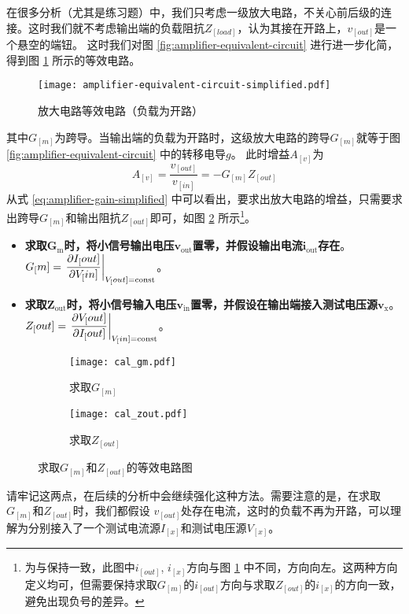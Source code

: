 在很多分析（尤其是练习题）中，我们只考虑一级放大电路，不关心前后级的连接。这时我们就不考虑输出端的负载阻抗$Z_[load]$，认为其接在开路上，$v_[out]$是一个悬空的端钮。
这时我们对图 \ref{fig:amplifier-equivalent-circuit} 进行进一步化简，得到图 \ref{fig:amplifier-equivalent-circuit-simplified} 所示的等效电路。
\begin{figure}[h!tb]
    \centering
    \texttt{[image: amplifier-equivalent-circuit-simplified.pdf]}
    \caption{放大电路等效电路（负载为开路）}
    \label{fig:amplifier-equivalent-circuit-simplified}
\end{figure}
其中$G_[m]$为跨导。当输出端的负载为开路时，这级放大电路的跨导$G_[m]$就等于图 \ref{fig:amplifier-equivalent-circuit} 中的转移电导$g$。
此时增益$A_[v]$为
\begin{equation}
    A_[v] = \frac{v_[out]}{v_[in]} = -G_[m] Z_[out]
    \label{eq:amplifier-gain-simplified}
\end{equation}
从式 \ref{eq:amplifier-gain-simplified} 中可以看出，要求出放大电路的增益，只需要求出跨导$G_[m]$和输出阻抗$Z_[out]$即可，如图 \ref{fig:get-gm-zout} 所示\footnote{为与\cite{Analog-CMOS}保持一致，此图中$i_[out]$, $i_[x]$方向与图 \ref{fig:amplifier-equivalent-circuit-simplified} 中不同，方向向左。这两种方向定义均可，但需要保持求取$G_[m]$的$i_[out]$方向与求取$Z_[out]$的$i_[x]$的方向一致，避免出现负号的差异。}。
\begin{itemize}
    \item \textbf{求取}$\bm{G_{\mathrm{m}}}$\textbf{时，将小信号输出电压}$\bm{v_{\mathrm{out}}}$\textbf{置零，并假设输出电流}$\bm{i_{\mathrm{out}}}$\textbf{存在}。$G_[m] = \eval{\dfrac{\partial I_[out]}{\partial V_[in]}}_{V_[out]=\text{const}}$。
    \item \textbf{求取}$\bm{Z_{\mathrm{out}}}$\textbf{时，将小信号输入电压}$\bm{v_{\mathrm{in}}}$\textbf{置零，并假设在输出端接入测试电压源}$\bm{v_{\mathrm{x}}}$。$Z_[out] = \eval{\dfrac{\partial V_[out]}{\partial I_[out]}}_{V_[in]=\text{const}}$。
\end{itemize}
\begin{figure}[htp!]
    \centering
    \begin{subfigure}[b]{0.48\textwidth}
        \centering
        \texttt{[image: cal\_gm.pdf]}
        \caption{求取$G_[m]$}
    \end{subfigure}
    \begin{subfigure}[b]{0.48\textwidth}
        \centering
        \texttt{[image: cal\_zout.pdf]}
        \caption{求取$Z_[out]$}
    \end{subfigure}
    \caption{求取$G_[m]$和$Z_[out]$的等效电路图}
    \label{fig:get-gm-zout}
\end{figure}
请牢记这两点，在后续的分析中会继续强化这种方法。需要注意的是，在\textcolor{deep-blue}{求取$G_[m]$和$Z_[out]$时}，我们都\textcolor{deep-blue}{假设} $v_[out]$处存在电流，这时的\textcolor{deep-blue}{负载不再为开路}，可以理解为分别接入了一个测试电流源$I_[x]$和测试电压源$V_[x]$。

